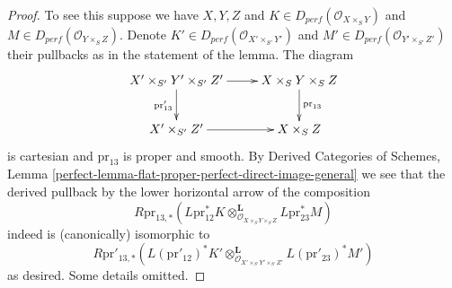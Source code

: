 \documentclass{stacks-project}
\theoremstyle{plain}
\theoremstyle{definition}
\theoremstyle{remark}
\numberwithin{equation}{subsection}
\begin{document}
\begin{proof}
To see this suppose we have $X, Y, Z$ and
$K \in D_{perf}(\mathcal{O}_{X \times_S Y})$ and
$M \in D_{perf}(\mathcal{O}_{Y \times_S Z})$.
Denote
$K' \in D_{perf}(\mathcal{O}_{X' \times_{S'} Y'})$ and
$M' \in D_{perf}(\mathcal{O}_{Y' \times_{S'} Z'})$
their pullbacks as in the statement of the lemma.
The diagram
$$
\xymatrix{
X' \times_{S'} Y' \times_{S'} Z' \ar[r] \ar[d]_{\text{pr}'_{13}} &
X \times_S Y \times_S Z \ar[d]^{\text{pr}_{13}} \\
X' \times_{S'} Z' \ar[r] &
X \times_S Z
}
$$
is cartesian and $\text{pr}_{13}$ is proper and smooth.
By Derived Categories of Schemes, Lemma
\ref{perfect-lemma-flat-proper-perfect-direct-image-general}
we see that the derived pullback by the lower horizontal
arrow of the composition
$$
R\text{pr}_{13, *}(
L\text{pr}_{12}^*K
\otimes_{\mathcal{O}_{X \times_S Y \times_S Z}}^\mathbf{L}
L\text{pr}_{23}^*M)
$$
indeed is (canonically) isomorphic to
$$
R\text{pr}'_{13, *}(
L(\text{pr}'_{12})^*K'
\otimes_{\mathcal{O}_{X' \times_{S'} Y' \times_{S'} Z'}}^\mathbf{L}
L(\text{pr}'_{23})^*M')
$$
as desired. Some details omitted.
\end{proof}
\end{document}
